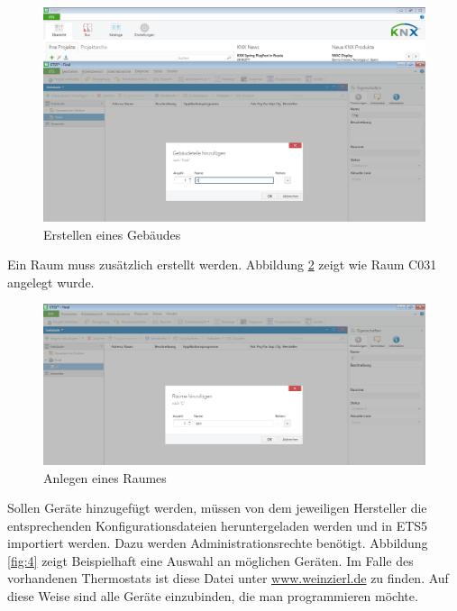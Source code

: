 \documentclass[a4paper]{article}
\begin{document}
\begin{figure}[H]
\centering
\includegraphics[width=13cm]{Doku/2}
\caption{Erstellen eines Gebäudes}
\label{fig:2}
\end{figure}

Ein Raum muss zusätzlich erstellt werden. Abbildung \ref{fig:3} zeigt wie Raum C031 angelegt wurde.

\begin{figure}[H]
\centering
\includegraphics[width=13cm]{Doku/3}
\caption{Anlegen eines Raumes}
\label{fig:3}
\end{figure}

Sollen Geräte hinzugefügt werden, müssen von dem jeweiligen Hersteller die entsprechenden Konfigurationsdateien heruntergeladen werden und in ETS5 importiert werden. Dazu werden Administrationsrechte benötigt. Abbildung \ref{fig:4} zeigt Beispielhaft eine Auswahl an möglichen Geräten. Im Falle des vorhandenen Thermostats ist diese Datei unter \href{https://www.weinzierl.de/images/download/software_tools/Weinzierl_KNX_Eno_63x_Tool.zip}{www.weinzierl.de} zu finden. Auf diese Weise sind alle Geräte einzubinden, die man programmieren möchte.
\end{document}
